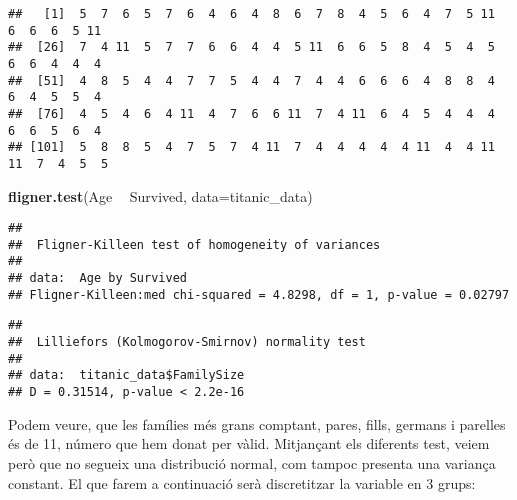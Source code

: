 \documentclass[]{article}
\newenvironment{Shaded}{\begin{snugshade}}{\end{snugshade}}
\newcommand{\DataTypeTok}[1]{\textcolor[rgb]{0.13,0.29,0.53}{#1}}
\newcommand{\KeywordTok}[1]{\textcolor[rgb]{0.13,0.29,0.53}{\textbf{#1}}}
\newcommand{\NormalTok}[1]{#1}
\newcommand{\OperatorTok}[1]{\textcolor[rgb]{0.81,0.36,0.00}{\textbf{#1}}}
\newcommand{\StringTok}[1]{\textcolor[rgb]{0.31,0.60,0.02}{#1}}
\begin{document}
\begin{Shaded}
\end{Shaded}

\begin{verbatim}
##   [1]  5  7  6  5  7  6  4  6  4  8  6  7  8  4  5  6  4  7  5 11  6  6  6  5 11
##  [26]  7  4 11  5  7  7  6  6  4  4  5 11  6  6  5  8  4  5  4  5  6  6  4  4  4
##  [51]  4  8  5  4  4  7  7  5  4  4  7  4  4  6  6  6  4  8  8  4  6  4  5  5  4
##  [76]  4  5  4  6  4 11  4  7  6  6 11  7  4 11  6  4  5  4  4  4  6  6  5  6  4
## [101]  5  8  8  5  4  7  5  7  4 11  7  4  4  4  4  4 11  4  4 11 11  7  4  5  5
\end{verbatim}

\begin{Shaded}
\begin{Highlighting}[]
\KeywordTok{fligner.test}\NormalTok{(Age }\OperatorTok{~}\StringTok{ }\NormalTok{Survived, }\DataTypeTok{data=}\NormalTok{titanic_data)}
\end{Highlighting}
\end{Shaded}

\begin{verbatim}
## 
##  Fligner-Killeen test of homogeneity of variances
## 
## data:  Age by Survived
## Fligner-Killeen:med chi-squared = 4.8298, df = 1, p-value = 0.02797
\end{verbatim}

\begin{Shaded}
\end{Shaded}

\begin{verbatim}
## 
##  Lilliefors (Kolmogorov-Smirnov) normality test
## 
## data:  titanic_data$FamilySize
## D = 0.31514, p-value < 2.2e-16
\end{verbatim}

Podem veure, que les famílies més grans comptant, pares, fills, germans
i parelles és de 11, número que hem donat per vàlid. Mitjançant els
diferents test, veiem però que no segueix una distribució normal, com
tampoc presenta una variança constant. El que farem a continuació serà
discretitzar la variable en 3 grups:
\end{document}

